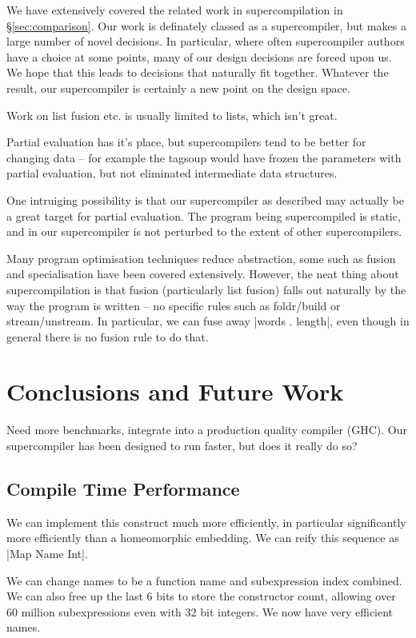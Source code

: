 \documentclass[draft]{sigplanconf}
\begin{document}
\begin{code}
We have extensively covered the related work in supercompilation in \S\ref{sec:comparison}. Our work is definately classed as a supercompiler, but makes a large number of novel decisions. In particular, where often supercompiler authors have a choice at some points, many of our design decisions are forced upon us. We hope that this leads to decisions that naturally fit together. Whatever the result, our supercompiler is certainly a new point on the design space.

Work on list fusion etc. is usually limited to lists, which isn't great.

Partial evaluation has it's place, but supercompilers tend to be better for changing data -- for example the tagsoup would have frozen the parameters with partial evaluation, but not eliminated intermediate data structures.

One intruiging possibility is that our supercompiler as described may actually be a great target for partial evaluation. The program being supercompiled is static, and in our supercompiler is not perturbed to the extent of other supercompilers.

Many program optimisation techniques reduce abstraction, some such as fusion and specialisation have been covered extensively. However, the neat thing about supercompilation is that fusion (particularly list fusion) falls out naturally by the way the program is written -- no specific rules such as foldr/build or stream/unstream. In particular, we can fuse away |words . length|, even though in general there is no fusion rule to do that.



\section{Conclusions and Future Work}

Need more benchmarks, integrate into a production quality compiler (GHC). Our supercompiler has been designed to run faster, but does it really do so?

\subsection{Compile Time Performance}

We can implement this construct much more efficiently, in particular significantly more efficiently than a homeomorphic embedding. We can reify this sequence as |Map Name Int|.

We can change names to be a function name and subexpression index combined. We can also free up the last 6 bits to store the constructor count, allowing over 60 million subexpressions even with 32 bit integers. We now have very efficient names.


\end{code}
\end{document}
